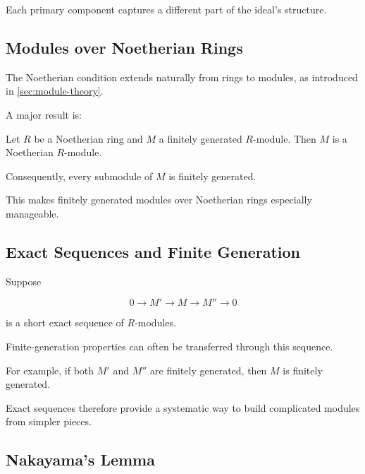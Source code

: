 Each primary component captures a different part of the ideal's structure.

\subsection{Modules over Noetherian Rings}
\label{subsec:modules-noetherian-rings}

The Noetherian condition extends naturally from rings to modules, as
introduced in \cref{sec:module-theory}.

A major result is:

\begin{theorem}
Let \(R\) be a Noetherian ring and \(M\) a finitely generated \(R\)-module.
Then \(M\) is a Noetherian \(R\)-module.
\end{theorem}

Consequently, every submodule of \(M\) is finitely generated.

This makes finitely generated modules over Noetherian rings especially
manageable.

\subsection{Exact Sequences and Finite Generation}
\label{subsec:exact-sequences-finite-generation}

Suppose

\[ 0\to M'\to M\to M''\to0 \]

is a short exact sequence of \(R\)-modules.

Finite-generation properties can often be transferred through this sequence.

For example, if both \(M'\) and \(M''\) are finitely generated, then \(M\) is
finitely generated.

Exact sequences therefore provide a systematic way to build complicated
modules from simpler pieces.

\subsection{Nakayama's Lemma}
\label{subsec:nakayama-lemma}

